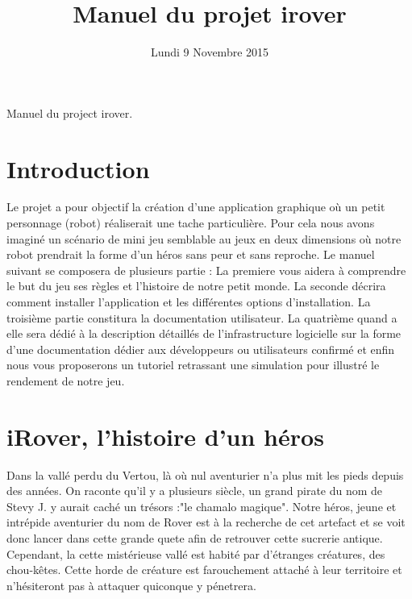 \documentclass[a4paper 12pts]{article}
\title{Manuel du projet irover}
\date{Lundi 9 Novembre 2015}
\author{}
\begin{document}
\maketitle

Manuel du project irover.


\newpage

\tableofcontents

\section{Introduction}



Le projet a pour objectif la création d'une application graphique où un petit personnage (robot) réaliserait une tache particulière.
Pour cela nous avons imaginé un scénario de mini jeu semblable au jeux en deux dimensions où notre robot prendrait la forme d'un héros sans peur et sans reproche.
Le manuel suivant se composera de plusieurs partie :
La premiere vous aidera à comprendre le but du jeu ses règles et l'histoire de notre petit monde.
La seconde décrira comment installer l'application et les différentes options d'installation.
La troisième partie constitura la documentation utilisateur.
La quatrième quand a elle sera dédié à la description détaillés de l'infrastructure logicielle sur la forme d'une documentation dédier aux développeurs ou utilisateurs confirmé et enfin nous vous proposerons un tutoriel retrassant une simulation pour illustré le rendement de notre jeu.


\section{iRover, l'histoire d'un héros}



Dans la vallé perdu du Vertou, là où nul aventurier n'a plus mit les pieds depuis des années. On raconte qu'il y a 
plusieurs siècle, un grand pirate du nom de Stevy J. y aurait caché un trésors :"le chamalo magique".
Notre héros, jeune et intrépide aventurier du nom de Rover est à la recherche de cet artefact et se voit donc lancer 
dans cette grande quete afin de retrouver cette sucrerie antique.
Cependant, la cette mistérieuse vallé est habité par d'étranges créatures, des chou-kêtes. 
Cette horde de créature est farouchement attaché à leur territoire et n'hésiteront pas à attaquer quiconque y pénetrera.
\end{document}
